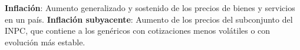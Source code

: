 \textbf{Inflación}:  Aumento generalizado y sostenido de los precios de bienes y servicios en un país.
\textbf{Inflación subyacente}:  Aumento de los precios del subconjunto del INPC, que contiene a los genéricos con cotizaciones menos volátiles o con evolución más estable.


